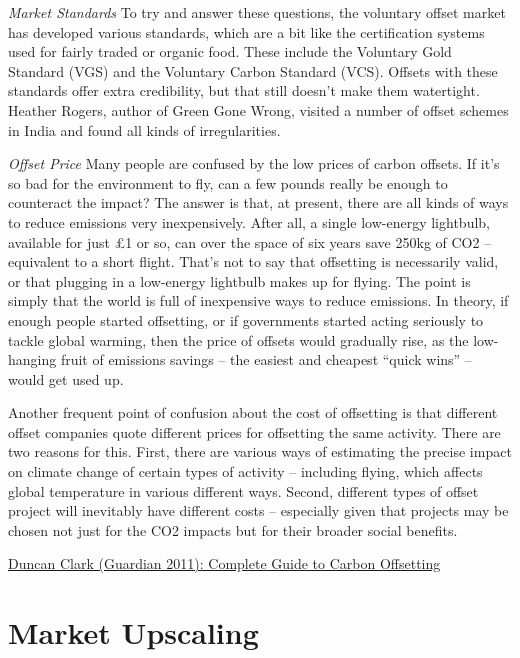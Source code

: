 \documentclass[
]{book}
\begin{document}
\emph{Market Standards}
To try and answer these questions, the voluntary offset market has developed various standards, which are a bit like the certification systems used for fairly traded or organic food. These include the Voluntary Gold Standard (VGS) and the Voluntary Carbon Standard (VCS).
Offsets with these standards offer extra credibility, but that still doesn't make them watertight. Heather Rogers, author of Green Gone Wrong, visited a number of offset schemes in India and found all kinds of irregularities.

\emph{Offset Price}
Many people are confused by the low prices of carbon offsets. If it's so bad for the environment to fly, can a few pounds really be enough to counteract the impact? The answer is that, at present, there are all kinds of ways to reduce emissions very inexpensively. After all, a single low-energy lightbulb, available for just £1 or so, can over the space of six years save 250kg of CO2 -- equivalent to a short flight. That's not to say that offsetting is necessarily valid, or that plugging in a low-energy lightbulb makes up for flying. The point is simply that the world is full of inexpensive ways to reduce emissions. In theory, if enough people started offsetting, or if governments started acting seriously to tackle global warming, then the price of offsets would gradually rise, as the low-hanging fruit of emissions savings -- the easiest and cheapest ``quick wins'' -- would get used up.

Another frequent point of confusion about the cost of offsetting is that different offset companies quote different prices for offsetting the same activity. There are two reasons for this. First, there are various ways of estimating the precise impact on climate change of certain types of activity -- including flying, which affects global temperature in various different ways. Second, different types of offset project will inevitably have different costs -- especially given that projects may be chosen not just for the CO2 impacts but for their broader social benefits.

\href{https://www.theguardian.com/environment/2011/sep/16/carbon-offset-projects-carbon-emissions\#:~:text=Carbon\%20offset\%20schemes\%20allow\%20individuals,designed\%20to\%20reduce\%20future\%20emissions.}{Duncan Clark (Guardian 2011): Complete Guide to Carbon Offsetting}

\hypertarget{market-upscaling}{%
\section{Market Upscaling}\label{market-upscaling}}
\end{document}
